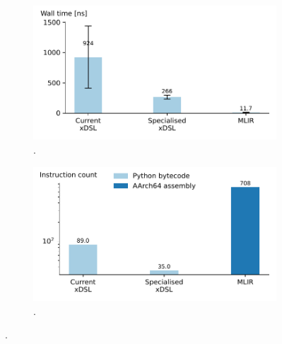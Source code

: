 \begin{figure}[H]
    \centering
    \begin{subfigure}[b]{0.45\textwidth}
        \includegraphics[width=\textwidth]{images/specialising_optimising_xdsl_rewriting/trait_performance.pdf}
        \caption{.}
        \label{fig:ubenchmark-original-trait-performance}
    \end{subfigure}
    \hfill
    \begin{subfigure}[b]{0.45\textwidth}
        \includegraphics[width=\textwidth]{images/specialising_optimising_xdsl_rewriting/trait_instructions.pdf}
        \caption{.}
        \label{ubenchmark-original-trait-instructions}
    \end{subfigure}
    \caption{.}
    \label{ubenchmark-original-trait-summary}
\end{figure}







